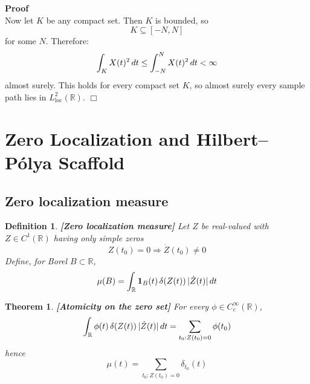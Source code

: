 \documentclass{article}
\newcommand{\tmop}[1]{\ensuremath{\operatorname{#1}}}
\newcommand{\tmstrong}[1]{\textbf{#1}}
\newcommand{\tmtextbf}[1]{\text{{\bfseries{#1}}}}
\newenvironment{proof}{\noindent\textbf{Proof\ }}{\hspace*{\fill}$\Box$\medskip}
\newtheorem{definition}{Definition}
\newtheorem{theorem}{Theorem}
\begin{document}
\begin{proof}
\begin{equation}
  \end{equation}
  Now let $K$ be any compact set. Then $K$ is bounded, so
  \begin{equation}
    K \subseteq [- N, N]
  \end{equation}
  for some $N$. Therefore:
  \begin{equation}
    \int_K X (t)^2  \hspace{0.17em} dt \leq \int_{- N}^N X (t)^2 
    \hspace{0.17em} dt < \infty
  \end{equation}
  almost surely. This holds for every compact set $K$, so almost surely every
  sample path lies in $L^2_{\tmop{loc}} (\mathbb{R})$.
\end{proof}

\section{Zero Localization and Hilbert--P{\'o}lya Scaffold}\label{sec:HP}

\subsection{Zero localization measure}

\begin{definition}
  {\tmstrong{[Zero localization measure]\label{def:zeromeasure}}} Let $Z$ be
  real-valued with $Z \in C^1 (\mathbb{R})$ having only simple zeros
  \begin{equation}
    Z (t_0) = 0 \Rightarrow \dot{Z} (t_0) \neq 0
  \end{equation}
  Define, for Borel $B \subset \mathbb{R}$,
  \begin{equation}
    \mu (B) = \int_{\mathbb{R}} \text{\tmtextbf{1}}_B (t)  \hspace{0.17em}
    \delta (Z (t)) \hspace{0.17em} | \dot{Z} (t) |  \hspace{0.17em} dt
  \end{equation}
\end{definition}

\begin{theorem}
  {\tmstrong{[Atomicity on the zero set]\label{thm:atomic}}} For every $\phi
  \in C_c^{\infty} (\mathbb{R})$,
  \begin{equation}
    \int_{\mathbb{R}} \phi (t)  \hspace{0.17em} \delta (Z (t)) \hspace{0.17em}
    | \dot{Z} (t) |  \hspace{0.17em} dt = \sum_{t_0 : Z (t_0) = 0} \phi (t_0)
  \end{equation}
  hence
  \begin{equation}
    \mu (t) = \sum_{t_0 : Z (t_0) = 0} \delta_{t_0} (t)
  \end{equation}
\end{theorem}
\end{document}
